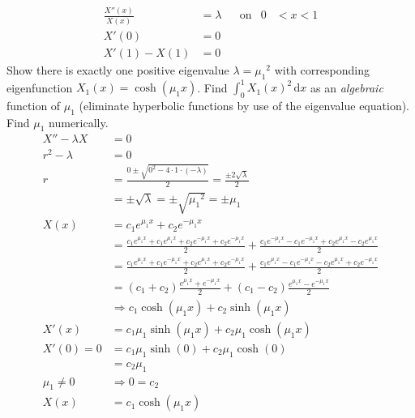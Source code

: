 \documentclass{article}
\begin{document}
\begin{align*}
  \frac{X''(x)}{X(x)}&=\lambda&&\text{on}&0&<x<1\\
  X'(0)&=0\\
  X'(1)-X(1)&=0
\end{align*}
Show there is exactly one positive eigenvalue $\lambda={\mu_1}^2$ with corresponding eigenfunction $X_1(x)=\cosh(\mu_1x)$. Find $\int_0^1{X_1(x)^2\,\mathrm{d}x}$ as an \emph{algebraic} function of $\mu_1$ (eliminate hyperbolic functions by use of the eigenvalue equation). Find $\mu_1$ numerically.
\begin{align*}
  X''-\lambda X&=0\\
  r^2-\lambda&=0\\
  r&=\frac{0\pm\sqrt{0^2-4\cdot1\cdot(-\lambda)}}{2}=\frac{\pm2\sqrt{\lambda}}{2}\\
  &=\pm\sqrt{\lambda}=\pm\sqrt{{\mu_1}^2}=\pm\mu_1\\
  X(x)&=c_1e^{\mu_1x}+c_2e^{-\mu_1x}\\
  &=\frac{c_1e^{\mu_1x}+c_1e^{\mu_1x}+c_2e^{-\mu_1x}+c_2e^{-\mu_1x}}{2}+\frac{c_1e^{-\mu_1x}-c_1e^{-\mu_1x}+c_2e^{\mu_1x}-c_2e^{\mu_1x}}{2}\\
  &=\frac{c_1e^{\mu_1x}+c_1e^{-\mu_1x}+c_2e^{\mu_1x}+c_2e^{-\mu_1x}}{2}+\frac{c_1e^{\mu_1x}-c_1e^{-\mu_1x}-c_2e^{\mu_1x}+c_2e^{-\mu_1x}}{2}\\
  &=(c_1+c_2)\frac{e^{\mu_1x}+e^{-\mu_1x}}{2}+(c_1-c_2)\frac{e^{\mu_1x}-e^{-\mu_1x}}{2}\\
  &\Rightarrow c_1\cosh(\mu_1x)+c_2\sinh(\mu_1x)\\
  X'(x)&=c_1\mu_1\sinh(\mu_1x)+c_2\mu_1\cosh(\mu_1x)\\
  X'(0)=0&=c_1\mu_1\sinh(0)+c_2\mu_1\cosh(0)\\
  &=c_2\mu_1\\
  \mu_1\ne 0&\Rightarrow0=c_2\\
  X(x)&=c_1\cosh(\mu_1x)\\
\end{align*}
\end{document}
